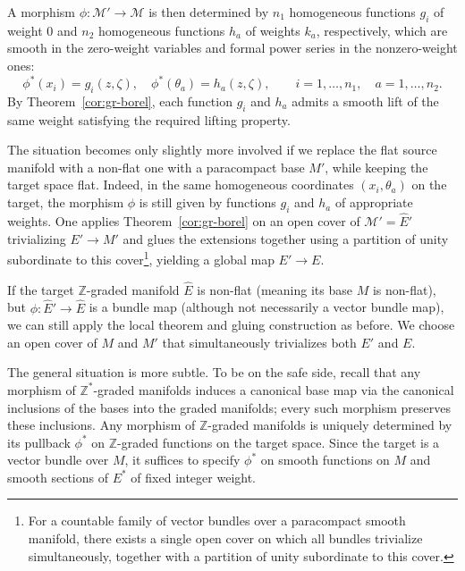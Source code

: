 \documentclass[a4paper,12pt]{amsart}
\newcommand{\cM}{{\mathcal M}}
\newcommand{\Z}{{\mathbb Z}}
\newcommand{\wE}{\widehat{E}}
\begin{document}
\smallskip\noindent
A morphism $\phi \colon \cM' \to \cM$ is then determined by $n_1$ homogeneous functions $g_i$ of weight $0$ 
and $n_2$ homogeneous functions $h_a$ of weights $k_a$, respectively, which are smooth in the zero-weight variables and formal power series in the nonzero-weight ones:
\[
\phi^*(x_i) = g_i(z, \zeta), 
\quad 
\phi^*(\theta_a) = h_a(z, \zeta),
\qquad
i = 1, \ldots, n_1,
\quad
a = 1, \ldots, n_2.
\]
By Theorem~\ref{cor:gr-borel}, each function $g_i$ and $h_a$ admits a smooth lift of the same weight satisfying the required lifting property.

\smallskip\noindent The situation becomes only slightly more involved if we replace the flat source manifold with a non-flat one with a paracompact base $M'$, while keeping the target space flat. Indeed, in the same homogeneous coordinates $(x_i,\theta_a)$ on the target, the morphism $\phi$ is still given by functions $g_i$ and $h_a$ of appropriate weights. One applies Theorem~\ref{cor:gr-borel} on an open cover of $\cM' = \wE'$ trivializing $E' \to M'$ and glues the extensions together using a partition of unity subordinate to this cover\footnote{For a countable family of vector bundles over a paracompact smooth manifold, there exists a single open cover on which all bundles trivialize simultaneously, together with a partition of unity subordinate to this cover.}, yielding a global map $E' \to E$.

\smallskip\noindent If the target $\Z$-graded manifold $\wE$ is non-flat (meaning its base $M$ is non-flat), but $\phi\colon \wE' \to \wE$ is a bundle map (although not necessarily a vector bundle map), we can still apply the local theorem and gluing construction as before. We choose an open cover of $M$ and $M'$ that simultaneously trivializes both $E'$ and $E$.


\smallskip\noindent The general situation is more subtle.
To be on the safe side, recall that any morphism of $\Z^*$-graded manifolds induces a canonical base map via the canonical inclusions of the bases into the graded manifolds; every such morphism preserves these inclusions. Any morphism of $\Z$-graded manifolds is uniquely determined by its pullback $\phi^*$ on $\Z$-graded functions on the target space.
 Since the target is a vector bundle over $M$, it suffices to specify $\phi^*$ on smooth functions on $M$ and smooth sections of $E^*$ of fixed integer weight. 
\end{document}
